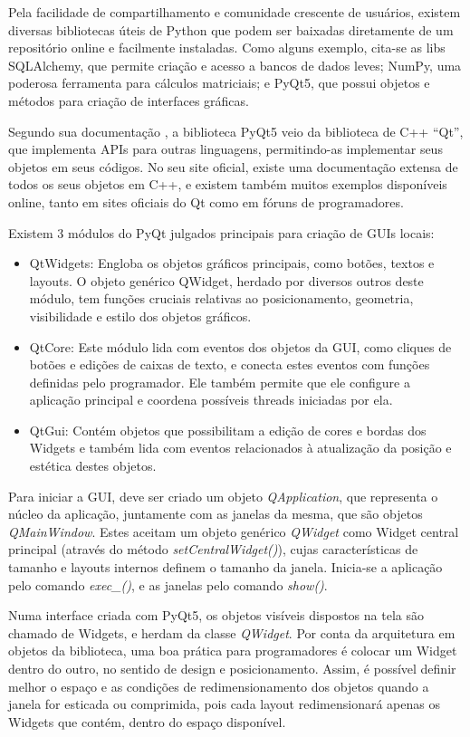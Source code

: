 Pela facilidade de compartilhamento e comunidade crescente de usuários, existem diversas bibliotecas úteis de Python que podem ser baixadas diretamente de um repositório online e facilmente instaladas. Como alguns exemplo, cita-se as libs SQLAlchemy, que permite criação e acesso a bancos de dados leves; NumPy, uma poderosa ferramenta para cálculos matriciais; e PyQt5, que possui objetos e métodos para criação de interfaces gráficas.

Segundo sua documentação \cite{QT2020}, a biblioteca PyQt5 veio da biblioteca de C++ “Qt”, que implementa APIs para outras linguagens, permitindo-as implementar seus objetos em seus códigos. No seu site oficial, existe uma documentação extensa de todos os seus objetos em C++, e existem também muitos exemplos disponíveis online, tanto em sites oficiais do Qt como em fóruns de programadores.

Existem 3 módulos do PyQt julgados principais para criação de GUIs locais:

\begin{itemize}
	\item QtWidgets: Engloba os objetos gráficos principais, como botões, textos e layouts. O objeto genérico QWidget, herdado por diversos outros deste módulo, tem funções cruciais relativas ao posicionamento, geometria, visibilidade e estilo dos objetos gráficos.
	\item QtCore: Este módulo lida com eventos dos objetos da GUI, como cliques de botões e edições de caixas de texto, e conecta estes eventos com funções definidas pelo programador. Ele também permite que ele configure a aplicação principal e coordena possíveis threads iniciadas por ela.
	\item QtGui: Contém objetos que possibilitam a edição de cores e bordas dos Widgets e também lida com eventos relacionados à atualização da posição e estética destes objetos.
\end{itemize}

Para iniciar a GUI, deve ser criado um objeto \emph{QApplication}, que representa o núcleo da aplicação, juntamente com as janelas da mesma, que são objetos \emph{QMainWindow}. Estes aceitam um objeto genérico \emph{QWidget} como Widget central principal (através do método \emph{setCentralWidget()}), cujas características de tamanho e layouts internos definem o tamanho da janela. Inicia-se a aplicação pelo comando \emph{exec\_()}, e as janelas pelo comando \emph{show()}.

Numa interface criada com PyQt5, os objetos visíveis dispostos na tela são chamado de Widgets, e herdam da classe \emph{QWidget}. Por conta da arquitetura em objetos da biblioteca, uma boa prática para programadores é colocar um Widget dentro do outro, no sentido de design e posicionamento. Assim, é possível definir melhor o espaço e as condições de redimensionamento dos objetos quando a janela for esticada ou comprimida, pois cada layout redimensionará apenas os Widgets que contém, dentro do espaço disponível.

